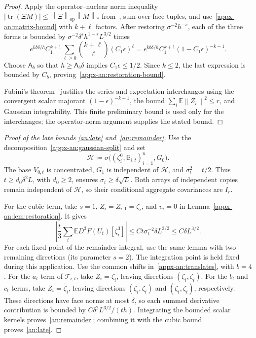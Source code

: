 \documentclass[11pt,letterpaper]{article}
\theoremstyle{remark}
\newcommand{\E}{\mathbb E}
\newcommand{\tr}{\operatorname{tr}}
\newcommand{\op}{\mathrm{op}}
\newcommand{\norm}[1]{\left\lVert#1\right\rVert}
\begin{document}
\begin{proof}
Apply the operator--nuclear norm inequality
\(|\tr(\Xi M)|\le\norm\Xi_\op\norm M_*\)
from~\cite[Chapter~IV]{Bhatia1997}, sum over face
tuples, and use~\eqref{appx-an:matrix-bound} with \(k+\ell\) factors.
After restoring \(\sigma^{-2}h^{-s}\), each of the three forms
is bounded by \(\sigma^{-2}\delta^sh^{1-s}L^{3/2}\) times
\[
 e^{kb\delta/h}C_1^{k+1}
 \sum_{\ell\ge0}\binom{k+\ell}{\ell}(C_1\epsilon)^\ell
 =e^{kb\delta/h}C_1^{k+1}(1-C_1\epsilon)^{-k-1}.
\]
Choose \(\mathsf A_b\) so that \(h\ge\mathsf A_b\delta\) implies
\(C_1\epsilon\le1/2\). Since \(k\le2\), the last expression is
bounded by \(C_b\), proving~\eqref{appx-an:restoration-bound}.

Fubini's theorem~\cite[Section~2.5]{Folland1999} justifies the
series and expectation interchanges using the convergent scalar
majorant \((1-\epsilon)^{-k-1}\), the bound
\(\sum_i\E\norm{Z_i}^2\le r\), and Gaussian integrability.
This finite preliminary bound is used only for the interchanges;
the operator-norm argument supplies the stated bound.
\end{proof}

\begin{proof}[Proof of the late bounds \eqref{an:late}
and~\eqref{an:remainder}]
Use the decomposition~\eqref{appx-an:gaussian-split} and set
\[
 \mathcal H\coloneqq
 \sigma\bigl((\zeta_i^0,\mathbb B_{i,t})_{i=1}^n,G_0\bigr).
\]
The base \(V_{0,t}\) is concentrated, \(G_1\) is independent
of \(\mathcal H\), and \(\sigma_t^2=t/2\).
Thus \(t\ge d_0\delta^2L\), with \(d_0\ge2\), ensures
\(\sigma_t\ge\delta\sqrt L\). Both arrays of independent copies
remain independent of \(\mathcal H\), so their conditional aggregate
covariances are \(I_r\).

For the cubic term, take \(s=1\), \(Z_i=Z_{i,1}=\zeta_i\), and
\(v_i=0\) in Lemma~\ref{appx-an:lem:restoration}. It gives
\begin{equation}
 \left|\frac t3\sum_i\E D^3F(U_t)[\zeta_i^3]\right|
 \le Ct\sigma_t^{-2}\delta L^{3/2}
 \le C\delta L^{3/2}.
 \label{appx-an:cubic-bound}
\end{equation}
For each fixed point of the remainder integral, use the same lemma
with two remaining directions (its parameter \(s=2\)). The integration
point is held fixed during this application.
Use the common shifts in~\eqref{appx-an:translates}, with \(b=4\). For the \(a_t\) term
of \(\mathcal T_{i,t}\), take \(Z_i=\zeta_i\), leaving directions
\((\zeta_i,\zeta_i)\). For the \(b_t\) and \(c_t\) terms,
take \(Z_i=\widetilde\zeta_i\), leaving directions
\((\zeta_i,\zeta_i)\) and \((\widetilde\zeta_i,\zeta_i)\),
respectively. These directions have face norms at most \(\delta\),
so each summed derivative contribution is bounded by
\(C\delta^2L^{3/2}/(t h)\). Integrating the bounded scalar
kernels proves~\eqref{an:remainder}; combining it with the cubic
bound proves~\eqref{an:late}.
\end{proof}
\end{document}

